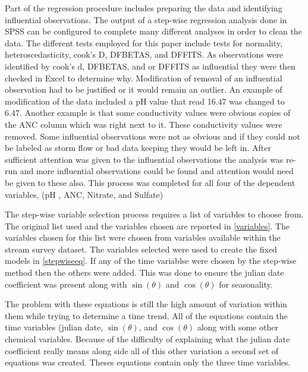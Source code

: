  Part of the regression procedure includes preparing the data and  identifying influential observations.  The output of a step-wise regression analysis done in SPSS can be configured to complete many different analyses in order to clean the data.  The different tests employed for this paper include tests for normality, heteroscedasticity, cook's D, DFBETAS, and DFFITS.  As observations were identified by cook's d, DFBETAS, and or DFFITS as influential they were then checked in Excel to determine why.  Modification of removal of an influential observation had to be justified or it would remain an outlier.  An example of modification of the data included a pH value that read 16.47 was changed to 6.47.  Another example is that some conductivity values were obvious copies of the ANC column which was right next to it.  These conductivity values were removed.   Some influential observations were not as obvious and if they could not be labeled as storm flow or bad data keeping they would be left in.  After sufficient attention was given to the influential observations the analysis was re-run and more influential observations could be found and attention would need be given to these also.  This process was completed for all four of the dependent variables, (pH , ANC, Nitrate, and Sulfate)
 
 The step-wise variable selection process requires a list of variables to choose from.  The original list used and the variables chosen are reported in \autoref{variables}.  The variables chosen for this list were chosen from variables available within the stream survey dataset.   The variables selected were used to create the fixed models in \autoref{stepwiseeq}.  If any of the time variablse were chosen by the step-wise method then the others were added.  This was done to ensure the julian date coefficient was present along with $\sin(\theta)$ and $\cos(\theta)$ for seasonality.
 
 The problem with these equations is still the high amount of variation within them while trying to determine a time trend.  All of the equations contain the time variables (julian date, $\sin(\theta)$, and $\cos(\theta)$ along with some other chemical variables.  Because of the difficulty of explaining what the julian date coefficient really means along side all of this other variation a second set of equations was created.  Theses equations contain only the three time variables.
 

